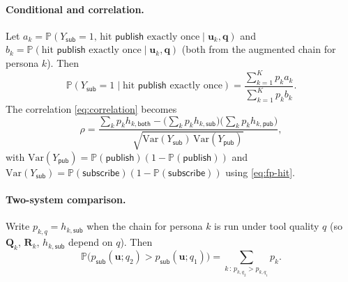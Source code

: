 \paragraph{Conditional and correlation.}
Let $a_k = \mathbb{P}(Y_{\mathsf{sub}} = 1,\, \text{hit }\mathsf{publish}\text{ exactly once} \mid \mathbf{u}_k, \mathbf{q})$ and $b_k = \mathbb{P}(\text{hit }\mathsf{publish}\text{ exactly once} \mid \mathbf{u}_k, \mathbf{q})$ (both from the augmented chain for persona $k$). Then
\begin{equation}
  \mathbb{P}(Y_{\mathsf{sub}} = 1 \mid \text{hit }\mathsf{publish}\text{ exactly once}) = \frac{\sum_{k=1}^K p_k a_k}{\sum_{k=1}^K p_k b_k}. \label{eq:fp-cond}
\end{equation}
The correlation \eqref{eq:correlation} becomes
\begin{equation}
  \rho = \frac{\sum_k p_k h_{k,\mathsf{both}} - \bigl(\sum_k p_k h_{k,\mathsf{sub}}\bigr)\bigl(\sum_k p_k h_{k,\mathsf{pub}}\bigr)}{\sqrt{\mathrm{Var}(Y_{\mathsf{sub}})\,\mathrm{Var}(Y_{\mathsf{pub}})}}, \label{eq:fp-corr}
\end{equation}
with $\mathrm{Var}(Y_{\mathsf{pub}}) = \mathbb{P}(\mathsf{publish})(1 - \mathbb{P}(\mathsf{publish}))$ and $\mathrm{Var}(Y_{\mathsf{sub}}) = \mathbb{P}(\mathsf{subscribe})(1 - \mathbb{P}(\mathsf{subscribe}))$ using \eqref{eq:fp-hit}.

\paragraph{Two-system comparison.}
Write $p_{k,q} = h_{k,\mathsf{sub}}$ when the chain for persona $k$ is run under tool quality $q$ (so $\mathbf{Q}_k$, $\mathbf{R}_k$, $h_{k,\mathsf{sub}}$ depend on $q$). Then
\begin{equation}
  \mathbb{P}\bigl(p_{\mathsf{sub}}(\mathbf{u}; q_2) > p_{\mathsf{sub}}(\mathbf{u}; q_1)\bigr) = \sum_{k \,:\, p_{k,q_2} > p_{k,q_1}} p_k. \label{eq:fp-beats}
\end{equation}

